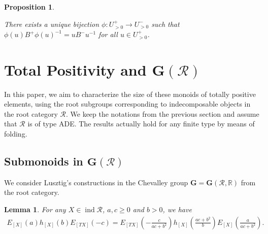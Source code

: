 \documentclass[12pt]{amsart}
\newtheorem{lemma}[theorem]{Lemma}
\newtheorem{proposition}[theorem]{Proposition}
\begin{document}
\begin{proposition}\label{u+-bij}
    \cite[Proposition 3.3]{TC}

    There exists a unique bijection $\phi: U^+_{>0}\rightarrow U^-_{>0}$ such that $\phi(u)B^+\phi(u)^{-1}=uB^- u^{-1}$ for all $u\in U^+_{>0}$.
\end{proposition}




\section{Total Positivity and $\mathbf{G}(\mathcal{R})$}

In this paper, we aim to characterize the size of these monoids of totally positive elements, using the root subgroups corresponding to indecomposable objects in the root category $\mathcal{R}$. 
We keep the notations from the previous section and assume that $\mathcal{R}$ is of type ADE.
The results actually hold for any finite type by means of folding.

\subsection{Submonoids in $\mathbf{G}(\mathcal{R})$}

We consider Lusztig's constructions in the Chevalley group $\mathbf{G}=\mathbf{G}(\mathcal{R},\mathbb{R})$ from the root category.

\begin{lemma}
    For any $X\in \operatorname{ind}\mathcal{R}$, $a,c\geq 0$ and $b>0$, we have
    \begin{align*}
        E_{[X]}(a) h_{[X]}(b) E_{[TX]}(-c) = E_{[TX]}(-\frac{c}{ac+b^2}) h_{[X]}(\frac{ac+b^2}{b}) E_{[X]}(\frac{a}{ac+b^2}).
    \end{align*}
\end{lemma}
\end{document}
